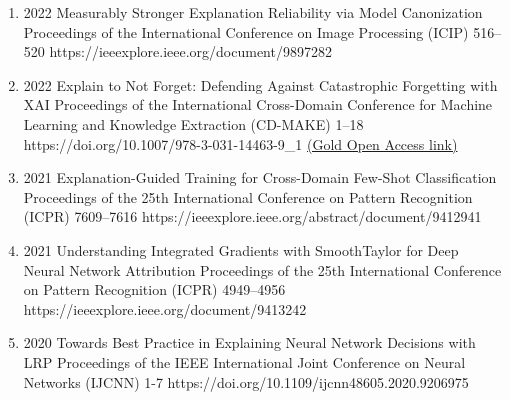 {\begin{enumerate}
        \item {}
                            {2022}
                            {Measurably Stronger Explanation Reliability via Model Canonization}
                            {Proceedings of the International Conference on Image Processing (ICIP)}
                            {516--520}
                            {https://ieeexplore.ieee.org/document/9897282}

        \item {}
                            {2022}
                            {Explain to Not Forget: Defending Against Catastrophic Forgetting with XAI}
                            {Proceedings of the International Cross-Domain Conference for Machine Learning and Knowledge Extraction (CD-MAKE)}
                            {1--18}
                            {https://doi.org/10.1007/978-3-031-14463-9_1}
                            {\href{https://link.springer.com/content/pdf/10.1007/978-3-031-04083-2.pdf}{(Gold Open Access link)}} %

        \item {}
                                {2021}
                                {Explanation-Guided Training for Cross-Domain Few-Shot Classification}
                                {Proceedings of the 25th International Conference on Pattern Recognition (ICPR)}
                                {7609--7616}
                                {https://ieeexplore.ieee.org/abstract/document/9412941}

        \item {}
                                {2021}
                                {Understanding Integrated Gradients with SmoothTaylor for Deep Neural Network Attribution}
                                {Proceedings of the 25th International Conference on Pattern Recognition (ICPR)}
                                {4949--4956}
                                {https://ieeexplore.ieee.org/document/9413242}

        \item {}
                                {2020}
                                {Towards Best Practice in Explaining Neural Network Decisions with LRP}
                                {Proceedings of the IEEE International Joint Conference on Neural Networks (IJCNN)}
                                {1-7}
                                {https://doi.org/10.1109/ijcnn48605.2020.9206975}


\end{enumerate}}
